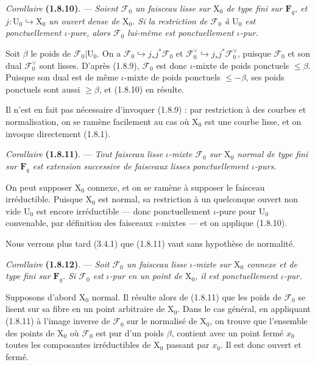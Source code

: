 \documentclass[11pt,leqno]{article}
\begin{document}
\textit{Corollaire} \textbf{(1.8.10)}. — \textit{Soient \(\mathscr{F}_0\) un faisceau lisse sur \(\mathrm{X}_0\) de type fini sur \(\mathbf{F}_q\), et \(j:\mathrm{U}_0\hookrightarrow\mathrm{X}_0\) un ouvert dense de \(\mathrm{X}_0\). Si la restriction de \(\mathscr{F}_0\) à \(\mathrm{U}_0\) est ponctuellement \(\iota\)-pure, alors \(\mathscr{F}_0\) lui-même est ponctuellement \(\iota\)-pur.}

Soit \(\beta\) le poids de \(\mathscr{F}_0\vert\mathrm{U}_0\). On a \(\mathscr{F}_0\hookrightarrow j_*j^*\mathscr{F}_0\) et \(\mathscr{F}_0^\vee\hookrightarrow j_*j^*\mathscr{F}_0^\vee\), puisque \(\mathscr{F}_0\) et son dual \(\mathscr{F}_0^\vee\) sont lisses. D’après (1.8.9), \(\mathscr{F}_0\) est donc \(\iota\)-mixte de poids ponctuels \(\leq\beta\). Puisque son dual est de même \(\iota\)-mixte de poids ponctuels \(\leq-\beta\), ses poids ponctuels sont aussi \(\geq\beta\), et (1.8.10) en résulte.

Il n’est en fait pas nécessaire d’invoquer (1.8.9) : par restriction à des courbes et normalisation, on se ramène facilement au cas où \(\mathrm{X}_0\) est une courbe lisse, et on invoque directement (1.8.1).

\textit{Corollaire} \textbf{(1.8.11)}. — \textit{Tout faisceau lisse \(\iota\)-mixte \(\mathscr{F}_0\) sur \(\mathrm{X}_0\) normal de type fini sur \(\mathbf{F}_q\) est extension successive de faisceaux lisses ponctuellement \(\iota\)-purs.}

On peut supposer \(\mathrm{X}_0\) connexe, et on se ramène à supposer le faisceau irréductible. Puisque \(\mathrm{X}_0\) est normal, sa restriction à un quelconque ouvert non vide \(\mathrm{U}_0\) est encore irréductible — donc ponctuellement \(\iota\)-pure pour \(\mathrm{U}_0\) convenable, par définition des faisceaux \(\iota\)-mixtes — et on applique (1.8.10).

Nous verrons plus tard (3.4.1) que (1.8.11) vaut sans hypothèse de normalité.

\textit{Corollaire} \textbf{(1.8.12)}. — \textit{Soit \(\mathscr{F}_0\) un faisceau lisse \(\iota\)-mixte sur \(\mathrm{X}_0\) connexe et de type fini sur \(\mathbf{F}_q\). Si \(\mathscr{F}_0\) est \(\iota\)-pur en un point de \(\mathrm{X}_0\), il est ponctuellement \(\iota\)-pur.}

Supposons d’abord \(\mathrm{X}_0\) normal. Il résulte alors de (1.8.11) que les poids de \(\mathscr{F}_0\) se lisent sur sa fibre en un point arbitraire de \(\mathrm{X}_0\). Dans le cas général, en appliquant (1.8.11) à l’image inverse de \(\mathscr{F}_0\) sur le normalisé de \(\mathrm{X}_0\), on trouve que l’ensemble des points de \(\mathrm{X}_0\) où \(\mathscr{F}_0\) est pur d’un poids \(\beta\), contient avec un point fermé \(x_0\) toutes les composantes irréductibles de \(\mathrm{X}_0\) passant par \(x_0\). Il est donc ouvert et fermé.
\end{document}
